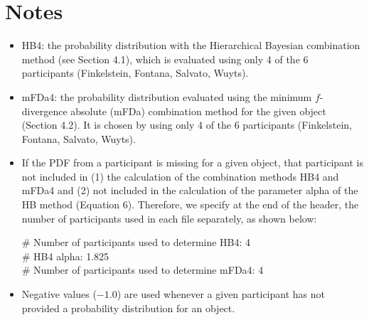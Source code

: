 \section*{Notes}
\begin{itemize}

\item HB4: the probability distribution with the Hierarchical Bayesian combination method (see Section 4.1), which is evaluated using only 4 of the 6 participants (Finkelstein, Fontana, Salvato, Wuyts).

\item mFDa4: the probability distribution evaluated using the minimum $f$-divergence absolute (mFDa) combination method for the given object (Section 4.2).  It is chosen by using only 4 of the 6 participants (Finkelstein, Fontana, Salvato, Wuyts).

\item If the PDF from a participant is missing for a given object, that participant is not included in (1) the calculation of the combination methods HB4 and mFDa4 and (2) not included in the calculation of the parameter alpha of the HB method (Equation 6). Therefore, we specify at the end of the header, the number of participants used in each file separately, as shown below:

\# Number of participants used to determine HB4: 4\\
\# HB4 alpha: 1.825\\
\# Number of participants used to determine mFDa4: 4

\item Negative values ($-1.0$) are used whenever a given participant has not provided a probability distribution for an object.

\end{itemize}
